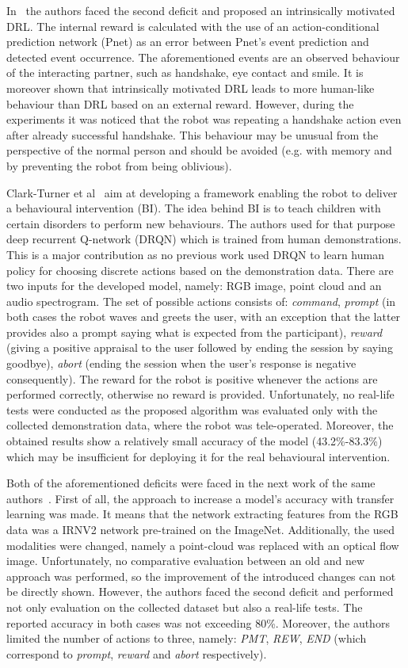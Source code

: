 \documentclass[thesis]{mas_proposal}
\begin{document}
In~\cite{Qureshi2018} the authors faced the second deficit and proposed an intrinsically motivated DRL. The internal reward is calculated with the use of an action-conditional prediction network (Pnet) as an error between Pnet's event prediction and detected event occurrence. The aforementioned events are an observed behaviour of the interacting partner, such as handshake, eye contact and smile. It is moreover shown that intrinsically motivated DRL leads to more human-like behaviour than DRL based on an external reward. However, during the experiments it was noticed that the robot was repeating a handshake action even after already successful handshake. This behaviour may be unusual from the perspective of the normal person and should be avoided (e.g. with memory and by preventing the robot from being oblivious).
 
Clark-Turner et al~\cite{ClarkTurner2017} aim at developing a framework enabling the robot to deliver a behavioural intervention (BI). The idea behind BI is to teach children with certain disorders to perform new behaviours. The authors used for that purpose deep recurrent Q-network (DRQN) which is trained from human demonstrations. This is a major contribution as no previous work used DRQN to learn human policy for choosing discrete actions based on the demonstration data. There are two inputs for the developed model, namely: RGB image, point cloud and an audio spectrogram. The set of possible actions consists of: \emph{command}, \emph{prompt} (in both cases the robot waves and greets the user, with an exception that the latter provides also a prompt saying what is expected from the participant), \emph{reward} (giving a positive appraisal to the user followed by ending the session by saying goodbye), \emph{abort} (ending the session when the user's response is negative consequently). The reward for the robot is positive whenever the actions are performed correctly, otherwise no reward is provided. Unfortunately, no real-life tests were conducted as the proposed algorithm was evaluated only with the collected demonstration data, where the robot was tele-operated. Moreover, the obtained results show a relatively small accuracy of the model (43.2\%-83.3\%) which may be insufficient for deploying it for the real behavioural intervention.

Both of the aforementioned deficits were faced in the next work of the same authors~\cite{Turner2018}. First of all, the approach to increase a model's accuracy with transfer learning was made. It means that the network extracting features from the RGB data was a IRNV2 network pre-trained on the ImageNet. Additionally, the used modalities were changed, namely a point-cloud was replaced with an optical flow image. Unfortunately, no comparative evaluation between an old and new approach was performed, so the improvement of the introduced changes can not be directly shown. However, the authors faced the second deficit and performed not only evaluation on the collected dataset but also a real-life tests. The reported accuracy in both cases was not exceeding 80\%. Moreover, the authors limited the number of actions to three, namely: \emph{PMT}, \emph{REW}, \emph{END} (which correspond to \emph{prompt}, \emph{reward} and \emph{abort} respectively).
\end{document}
